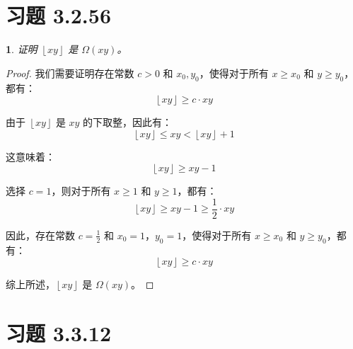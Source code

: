 \documentclass[UTF8]{report}
\theoremstyle{MyLineTheoremStyle} %
\theoremstyle{MyBlockTheoremStyle} %
\theoremstyle{MySubsubsectionStyle} %
\newtheorem{definition}{}
\begin{document}
\section{习题 3.2.56}
\begin{definition}
    证明 \( \left\lfloor xy \right\rfloor \) 是 \( \Omega(xy) \)。
\end{definition}

\begin{proof}
    我们需要证明存在常数 \( c > 0 \) 和 \( x_0, y_0 \)，使得对于所有 \( x \geq x_0 \) 和 \( y \geq y_0 \)，都有：
    \[
    \left\lfloor xy \right\rfloor \geq c \cdot xy
    \]

    由于 \( \left\lfloor xy \right\rfloor \) 是 \( xy \) 的下取整，因此有：
    \[
    \left\lfloor xy \right\rfloor \leq xy < \left\lfloor xy \right\rfloor + 1
    \]

    这意味着：
    \[
    \left\lfloor xy \right\rfloor \geq xy - 1
    \]

    选择 \( c = 1 \)，则对于所有 \( x \geq 1 \) 和 \( y \geq 1 \)，都有：
    \[
    \left\lfloor xy \right\rfloor \geq xy - 1 \geq \frac{1}{2} \cdot xy
    \]

    因此，存在常数 \( c = \frac{1}{2} \) 和 \( x_0 = 1 \)，\( y_0 = 1 \)，使得对于所有 \( x \geq x_0 \) 和 \( y \geq y_0 \)，都有：
    \[
    \left\lfloor xy \right\rfloor \geq c \cdot xy
    \]

    综上所述，\( \left\lfloor xy \right\rfloor \) 是 \( \Omega(xy) \)。
\end{proof}

\section{习题 3.3.12}
\end{document}
